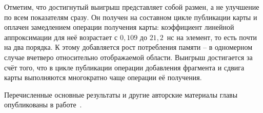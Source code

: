 Отметим, что достигнутый выигрыш представляет собой размен, а не улучшение по всем показателям сразу. Он получен на составном цикле публикации карты и оплачен замедлением операции получения карты: коэффициент линейной аппроксимации для неё возрастает с $0,109$ до $21,2$~нс на элемент, то есть почти на два порядка. К этому добавляется рост потребления памяти -- в одномерном случае вчетверо относительно отображаемой области. Выигрыш достигается за счёт того, что в цикле публикации операции добавления фрагмента и сдвига карты выполняются многократно чаще операции её получения.

Перечисленные основные результаты и другие авторские материалы главы опубликованы в работе~\cite{чеканов2026многопоточные}.

\clearpage